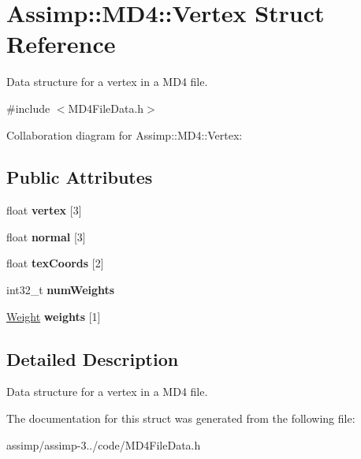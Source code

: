 \hypertarget{struct_assimp_1_1_m_d4_1_1_vertex}{\section{Assimp\+:\+:M\+D4\+:\+:Vertex Struct Reference}
\label{struct_assimp_1_1_m_d4_1_1_vertex}
}


Data structure for a vertex in a M\+D4 file.  




{\ttfamily \#include $<$M\+D4\+File\+Data.\+h$>$}



Collaboration diagram for Assimp\+:\+:M\+D4\+:\+:Vertex\+:
\subsection*{Public Attributes}
\begin{DoxyCompactItemize}
\item 
\hypertarget{struct_assimp_1_1_m_d4_1_1_vertex_a0698d08970069dcd30ea44ceb27c53a7}{float {\bfseries vertex} \mbox{[}3\mbox{]}}\label{struct_assimp_1_1_m_d4_1_1_vertex_a0698d08970069dcd30ea44ceb27c53a7}

\item 
\hypertarget{struct_assimp_1_1_m_d4_1_1_vertex_a70738e54a2716e7ebb233a8ae3a6bd1d}{float {\bfseries normal} \mbox{[}3\mbox{]}}\label{struct_assimp_1_1_m_d4_1_1_vertex_a70738e54a2716e7ebb233a8ae3a6bd1d}

\item 
\hypertarget{struct_assimp_1_1_m_d4_1_1_vertex_a07d837cb89e100d04f997670d3de3c8b}{float {\bfseries tex\+Coords} \mbox{[}2\mbox{]}}\label{struct_assimp_1_1_m_d4_1_1_vertex_a07d837cb89e100d04f997670d3de3c8b}

\item 
\hypertarget{struct_assimp_1_1_m_d4_1_1_vertex_a2791aac79f858272d8ecba4ed0a65ff7}{int32\+\_\+t {\bfseries num\+Weights}}\label{struct_assimp_1_1_m_d4_1_1_vertex_a2791aac79f858272d8ecba4ed0a65ff7}

\item 
\hypertarget{struct_assimp_1_1_m_d4_1_1_vertex_a1435401a59f83af30ab71beaf3864c0a}{\hyperlink{struct_assimp_1_1_m_d4_1_1_weight}{Weight} {\bfseries weights} \mbox{[}1\mbox{]}}\label{struct_assimp_1_1_m_d4_1_1_vertex_a1435401a59f83af30ab71beaf3864c0a}

\end{DoxyCompactItemize}


\subsection{Detailed Description}
Data structure for a vertex in a M\+D4 file. 

The documentation for this struct was generated from the following file\+:\begin{DoxyCompactItemize}
\item 
assimp/assimp-\/3../code/M\+D4\+File\+Data.\+h\end{DoxyCompactItemize}
